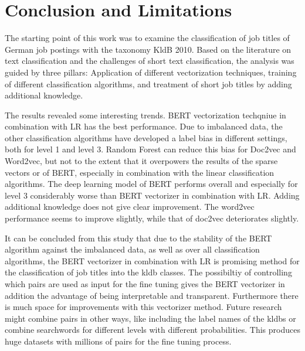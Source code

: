 \documentclass[12pt, a4paper, titlepage]{article}
\begin{document}
\section{Conclusion and Limitations}
The starting point of this work was to examine the classification of job titles of German job postings with the taxonomy \ac{KldB} 2010. Based on the literature on text classification and the challenges of short text classification, the analysis was guided by three pillars: Application of different vectorization techniques, training of different classification algorithms, and treatment of short job titles by adding additional knowledge. 

The results revealed some interesting trends. \ac{BERT} vectorization techqniue in combination with \ac{LR} has the best performance. Due to imbalanced data, the other classification algorithms have developed a label bias in different settings, both for level 1 and level 3. Random Forest can reduce this bias for Doc2vec and Word2vec, but not to the extent that it overpowers the results of the sparse vectors or of BERT, especially in combination with the linear classification algorithms. The deep learning model of BERT performs overall and especially for level 3 considerably worse than BERT vectorizer in combination with LR. Adding additional knowledge does not give clear improvement. The word2vec performance seems to improve slightly, while that of doc2vec deteriorates slightly. 

It can be concluded from this study that due to the stability of the \ac{BERT} algorithm against the imbalanced data, as well as over all classification algorithms, the BERT vectorizer in combination with LR is promising method for the classification of job titles into the kldb classes. The possibiltiy of controlling which pairs are used as input for the fine tuning gives the \ac{BERT} vectorizer in addition the advantage of being interpretable and transparent. Furthermore there is much space for improvements with this vectorizer method. Future research might combine pairs in other ways, like including the label names of the kldbs or combine searchwords for different levels with different probabilities. This produces huge datasets with millions of pairs for the fine tuning process. 
\end{document}
